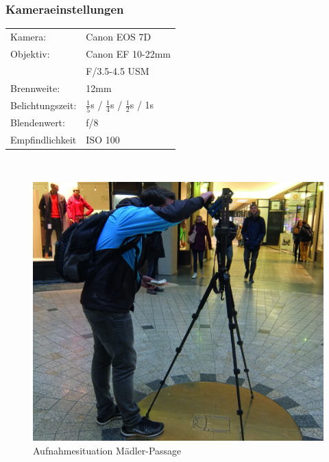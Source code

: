 \documentclass[liststotoc,bibtotoc,fontsize=14pt,]{scrreprt}
\begin{document}
			\subsubsection{Kameraeinstellungen}
			\begin{minipage}{0.58\textwidth}
				\begin{tabular}{ll}
					Kamera: &Canon EOS 7D \\
					Objektiv: &Canon EF 10-22mm \\
					& F/3.5-4.5 USM\\		
					Brennweite:& 12mm \\
					Belichtungszeit: &$\frac{1}{5}$s / $\frac{1}{4}$s / $\frac{1}{2}$s / 1s\\
					Blendenwert: & f/8\\
					Empfindlichkeit & ISO 100 \\
				\end{tabular}\\
			\end{minipage}%
			\begin{minipage}{0.42\textwidth}
				\begin{figure}[H]
					\includegraphics[width=\linewidth]{img/places/mae.jpg}
					\caption{Aufnahmesituation  Mädler-Passage}
					\label{img:ak}
				\end{figure}
			\end{minipage}%
			
\end{document}
